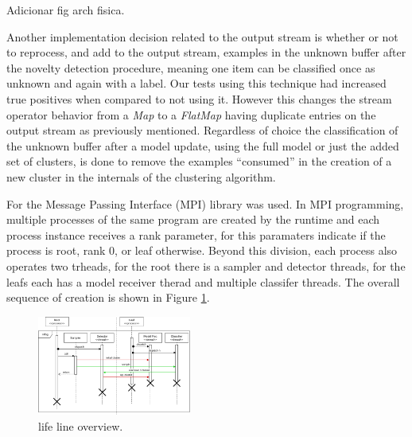 \documentclass[conference]{IEEEtran}
\begin{document}

Adicionar fig arch fisica.

Another implementation decision related to the output stream is whether or not
to reprocess, and add to the output stream, examples in the unknown buffer after
the novelty detection procedure, meaning one item can be classified once as
unknown and again with a label.
Our tests using this technique had increased true positives when compared to
not using it.
However this changes the stream operator behavior from a \textit{Map} to a
\textit{FlatMap} having duplicate entries on the output stream as previously
mentioned.
Regardless of choice the classification of the unknown buffer after a model
update, using the full model or just the added set of clusters, is done to
remove the examples ``consumed'' in the creation of a new cluster in the internals
of the clustering algorithm.



\newcommand{\reffig}[1]{Figure \ref{fig:#1}\xspace}

For \mfog the Message Passing Interface (MPI) library was used.
In MPI programming, multiple processes of the same program are created by the
runtime and each process instance receives a rank parameter, for \mfog this
paramaters indicate if the process is root, rank $0$, or leaf otherwise.
Beyond this division, each process also operates two trheads, for the root
there is a sampler and detector threads, for the leafs each has a model receiver
therad and multiple classifer threads.
The overall sequence of creation is shown in \reffig{mfog-mpi-life}.

\begin{figure}[htbp]
  \centerline{\includegraphics[width=0.45\textwidth]{figures/mfog-arch-mpi.png}}
  \caption{\mfog life line overview.}
  \label{fig:mfog-mpi-life}
\end{figure}
\end{document}
